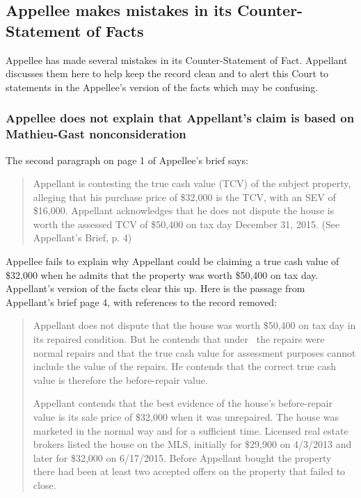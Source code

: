\documentclass[12pt,\documentclassflag]{michiganCourtOfAppealsBrief}
\begin{document}
\subsection{Appellee makes mistakes in its Counter-Statement of Facts}

Appellee has made several mistakes in its Counter-Statement of Fact. Appellant discusses them here to help keep the record clean and to alert this Court to statements in the Appellee's version of the facts which may be confusing.

\subsubsection{Appellee does not explain that Appellant's claim is based on Mathieu-Gast nonconsideration}


The second paragraph on page 1 of Appellee's brief says:

\begin{quote}
Appellant is contesting the true cash value (TCV) of the subject property, alleging that his
purchase price of \$32,000 is the TCV, with an SEV of \$16,000. Appellant acknowledges that he
does not dispute the house is worth the assessed TCV of \$50,400 on tax day December 31, 2015. (See Appellant's Brief, p. 4)
\end{quote}

Appellee fails to explain why Appellant could be claiming a true cash value of \$32,000 when he admits that the property was worth \$50,400 on tax day. Appellant's version of the facts clear this up. Here is the passage from Appellant's brief page 4, with references to the record removed:

\begin{quotation}\label{subsubsec:mainPoint}
  Appellant does not dispute that the house was worth \$50,400 on tax day in its repaired condition. But he contends that under \mathieuGast\ the repairs were normal repairs and that the true cash value for assessment purposes cannot include the value of the repairs. He contends that the correct true cash value is therefore the before-repair value. 

Appellant contends that the best evidence of the house's before-repair value is its sale price of \$32,000 when it was unrepaired. The house was marketed in the normal way and for a sufficient time. Licensed real estate brokers listed the house on the MLS, initially for \$29,900 on 4/3/2013 and later for \$32,000 on 6/17/2015. Before Appellant bought the property there had been at least two accepted offers on the property that failed to close.
\end{quotation}
\end{document}
